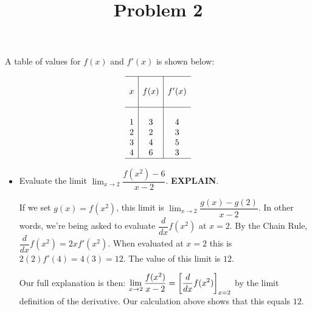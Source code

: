 \documentclass{ximera}
\title[Problem 2]{Problem 2}
\begin{document}
\begin{abstract} \end{abstract}
\maketitle


\begin{problem}
 A table of values for $f(x)$ and $f'(x)$ is shown below:


$$\begin{array}{c|c|c}
	\hline
	& & \\
	x & f(x) & f'(x) \\
	& & \\
	\hline
	& & \\
	1 & 3 & 4\\
	2 & 2 & 3\\
	3 & 4 & 5\\
	4 & 6 & 3\\
	\hline
\end{array} $$

	\begin{itemize}
		\item	Evaluate the limit $\displaystyle \lim_{x \to 2} \dfrac{f(x^2)-6}{x-2}$. \textbf{EXPLAIN}.
\begin{explanation}
				If we set $g(x) = f(x^2)$, this limit is $\displaystyle \lim_{x\to 2} \dfrac{g(x)-g(2)}{x-2}$. In other words, we're being asked to
				evaluate $\displaystyle\dfrac{d}{dx} f(x^2)$ at $x = 2$. By the Chain Rule, $\displaystyle\dfrac{d}{dx} f(x^2) = 2x f'(x^2)$. When evaluated at $x=2$
				this is $2(2) f'(4) = 4 (3) = 12$. The value of this limit is $12$.
				
				Our full explanation is then:
				$\displaystyle \lim_{x\to 2} \dfrac{f(x^2)}{x-2} = \bigg[ \dfrac{d}{dx} f(x^2)  \bigg]_{x=2}$ by the limit definition of the derivative. Our calculation above shows that this equals $12$.
			  \end{explanation}	


\end{itemize}
\end{problem}
\end{document}
